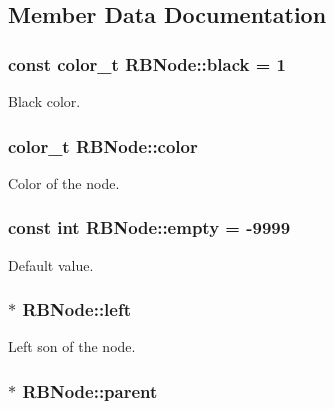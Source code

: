 \subsection{Member Data Documentation}
\hypertarget{class_r_b_node_af06dfc3afd8618bf3c6c352c74ba10fc}{
\subsubsection[{black}]{\setlength{\rightskip}{0pt plus 5cm}const color\+\_\+t R\+B\+Node\+::black = 1\hspace{0.3cm}{\ttfamily [static]}}}\label{class_r_b_node_af06dfc3afd8618bf3c6c352c74ba10fc}
Black color. \hypertarget{class_r_b_node_aaa0b3a6a0ddb8fee8295b2a5bf876f07}{
\subsubsection[{color}]{\setlength{\rightskip}{0pt plus 5cm}color\+\_\+t R\+B\+Node\+::color}}\label{class_r_b_node_aaa0b3a6a0ddb8fee8295b2a5bf876f07}
Color of the node. \hypertarget{class_r_b_node_a139c48e69866041cc111cf161e739ec1}{
\subsubsection[{empty}]{\setlength{\rightskip}{0pt plus 5cm}const int R\+B\+Node\+::empty = -\/9999\hspace{0.3cm}{\ttfamily [static]}}}\label{class_r_b_node_a139c48e69866041cc111cf161e739ec1}
Default value. \hypertarget{class_r_b_node_a3345545f8a1678010bca11b5f7153a4a}{
\subsubsection[{left}]{$\ast$ R\+B\+Node\+::left}}\label{class_r_b_node_a3345545f8a1678010bca11b5f7153a4a}
Left son of the node. \hypertarget{class_r_b_node_a131e0d1a4f73d55e6b5ad282c6846612}{
\subsubsection[{parent}]{$\ast$ R\+B\+Node\+::parent}}\label{class_r_b_node_a131e0d1a4f73d55e6b5ad282c6846612}
